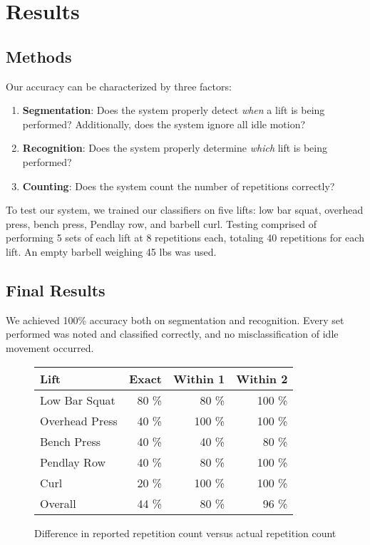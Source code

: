\chapter{Results}


\section{Methods}
Our accuracy can be characterized by three factors:

\begin{enumerate}
    \item \textbf{Segmentation}: Does the system properly detect \textit{when} a lift is being performed? Additionally, does the system ignore all idle motion?
    \item \textbf{Recognition}: Does the system properly determine \textit{which} lift is being performed?
    \item \textbf{Counting}: Does the system count the number of repetitions correctly?
\end{enumerate}

To test our system, we trained our classifiers on five lifts: low bar squat, overhead press, bench press, Pendlay row, and barbell curl. Testing comprised of performing 5 sets of each lift at 8 repetitions each, totaling 40 repetitions for each lift. An empty barbell weighing 45 lbs was used. 


\section{Final Results}
We achieved 100\% accuracy both on segmentation and recognition. Every set performed was noted and classified correctly, and no misclassification of idle movement occurred. 

\begin{figure}
    \centering
    \begin{tabular}{l r r r}
        \toprule
        Lift           & Exact   & Within 1 & Within 2 \\
        \midrule[\heavyrulewidth]
        Low Bar Squat  & 80 \%    & 80 \%     & 100 \% \\
        Overhead Press & 40 \%    & 100 \%    & 100 \% \\
        Bench Press    & 40 \%    & 40 \%     & 80 \%  \\
        Pendlay Row    & 40 \%    & 80 \%     & 100 \% \\
        Curl           & 20 \%    & 100 \%    & 100 \% \\
        \midrule
        Overall        & 44 \%   & 80 \%    & 96 \%    \\
        \bottomrule
    \end{tabular}
    \caption{Difference in reported repetition count versus actual repetition count}
\end{figure}
